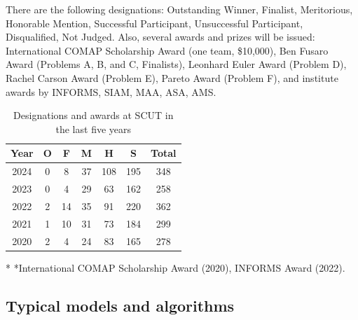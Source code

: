 \documentclass[12pt]{article}  %
\begin{document}
 There are the following designations: Outstanding Winner, Finalist, Meritorious, Honorable Mention, Successful Participant, Unsuccessful Participant, Disqualified, Not Judged. Also, several awards and prizes will be issued: International COMAP Scholarship Award (one team, \$10,000), Ben Fusaro Award (Problems A, B, and C, Finalists), Leonhard Euler Award (Problem D), Rachel Carson Award (Problem E), Pareto Award (Problem F), and institute awards by INFORMS, SIAM, MAA, ASA, AMS. 
 
 \begin{table}[htbp]
     \begin{center}		
         \caption{Designations and awards at SCUT in the last five years}
                 \begin{tabular}{ccccccc} %
             \toprule[2pt]
             \multicolumn{1}{m{2cm}}{\centering Year}
             &\multicolumn{1}{m{1cm}}{\centering O}	&\multicolumn{1}{m{1cm}}{\centering F}	&\multicolumn{1}{m{1cm}}{\centering M}	&\multicolumn{1}{m{1cm}}{\centering H}	&\multicolumn{1}{m{1cm}}{\centering S}&\multicolumn{1}{m{2cm}}{\centering Total}\\  %
             \midrule
                 2024   & 0 & 8 & 37 & 108 & 195 &348\\
             2023   & 0 & 4 & 29 & 63 & 162 &258\\
             2022   & 2 & 14 & 35 & 91 & 220 &362\\
             2021   & 1 & 10 & 31 & 73 & 184 &299\\
             2020   & 2 & 4 & 24 & 83 & 165 &278\\
             \bottomrule[2pt]
         \end{tabular}	\label{tab3} %
                 \begin{tablenotes}
             \footnotesize
             \item[*] *International COMAP Scholarship Award (2020), INFORMS Award (2022). %
         \end{tablenotes} 
     \end{center}
 \end{table} 
 
  
 \subsection{Typical models and algorithms}
 
\end{document}
